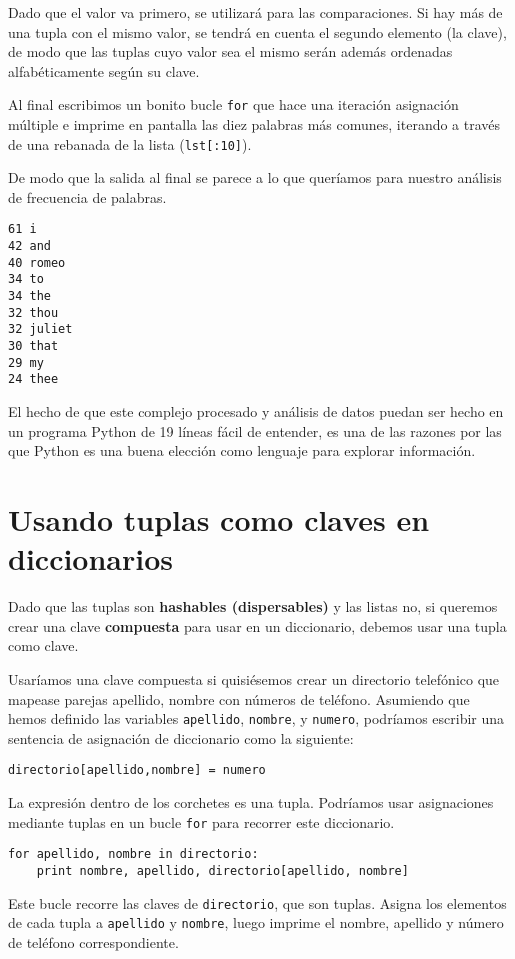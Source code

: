 Dado que el valor va primero, se utilizará para las comparaciones.
Si hay más de una tupla con el mismo valor, se tendrá en cuenta
el segundo elemento (la clave), de modo que las tuplas cuyo valor sea
el mismo serán además ordenadas alfabéticamente según su clave.

Al final escribimos un bonito bucle {\tt for} que hace una iteración
asignación múltiple e imprime en pantalla las diez palabras más comunes,
iterando a través de una rebanada de la lista ({\tt lst[:10]}).

De modo que la salida al final se parece a lo que queríamos para
nuestro análisis de frecuencia de palabras.

\beforeverb
\begin{verbatim}
61 i
42 and
40 romeo
34 to
34 the
32 thou
32 juliet
30 that
29 my
24 thee
\end{verbatim}
\afterverb
%
El hecho de que este complejo procesado y análisis de datos
puedan ser hecho en un programa Python de 19 líneas
fácil de entender, es una de las razones por las que Python es una buena elección
como lenguaje para explorar información.

\section{Usando tuplas como claves en diccionarios}


Dado que las tuplas son {\bf hashables (dispersables)} y las listas no, si queremos
crear una clave {\bf compuesta} para usar en un diccionario, debemos usar una tupla
como clave.

Usaríamos una clave compuesta si quisiésemos crear un
directorio telefónico que mapease
parejas apellido, nombre con números de teléfono. Asumiendo
que hemos definido las variables
{\tt apellido}, {\tt nombre}, y {\tt numero}, podríamos escribir
una sentencia de asignación de diccionario como la siguiente:

\beforeverb
\begin{verbatim}
directorio[apellido,nombre] = numero
\end{verbatim}
\afterverb
%
La expresión dentro de los corchetes es una tupla. Podríamos usar
asignaciones mediante tuplas en un bucle {\tt for} para recorrer este diccionario.


\beforeverb
\begin{verbatim}
for apellido, nombre in directorio:
    print nombre, apellido, directorio[apellido, nombre]
\end{verbatim}
\afterverb
%
Este bucle recorre las claves de {\tt directorio}, que son tuplas.
Asigna los elementos de cada tupla a {\tt apellido} y {\tt nombre}, luego
imprime el nombre, apellido y número de teléfono correspondiente.


